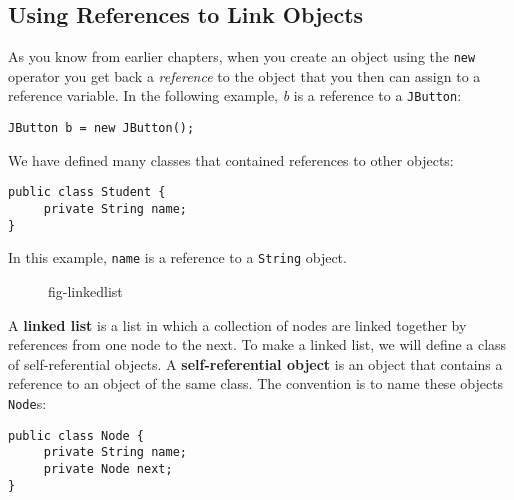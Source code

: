 \subsection{Using References to Link Objects}
\noindent As you know from earlier chapters, when you create an 
object using the
{\tt new} operator you get back a {\em reference} to the object
that you then can assign to a reference variable.  In the following
example, {\it b} is a reference to a {\tt JButton}:

\begin{jjjlisting}
\begin{lstlisting}
JButton b = new JButton();
\end{lstlisting}
\end{jjjlisting}

\noindent We have defined many classes that contained
references to other objects:

\begin{jjjlisting}
\begin{lstlisting}
public class Student {
     private String name;
}
\end{lstlisting}
\end{jjjlisting}

\noindent In this example, {\tt name} is a reference to a {\tt String}
object.


\begin{figure}[tb]
{fig-linkedlist}
\end{figure}

A {\bf linked list} is a list in which a 
collection of nodes are
linked together by references from one node to the next.  To make a
linked list, we will define a class of self-referential
objects.  A {\bf self-referential object} is an object that contains a reference to an object of the
same class.  The convention is to name these objects {\tt Node}s:

\begin{jjjlisting}
\begin{lstlisting}
public class Node {
     private String name;
     private Node next;
}
\end{lstlisting}
\end{jjjlisting}

